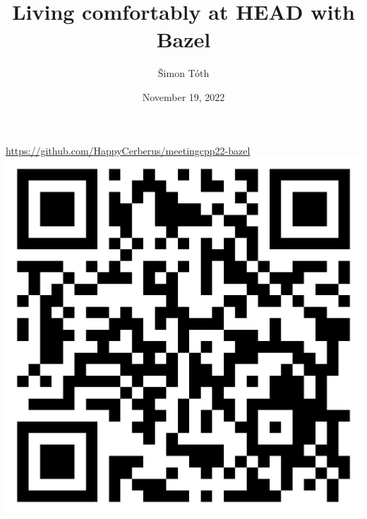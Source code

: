 \documentclass[aspectratio=169]{beamer}
\date{November 19, 2022}
\title{Living comfortably at HEAD with Bazel}
\author{Šimon Tóth}
\begin{document}
\begin{frame}{}
    \titlepage
\end{frame}

\begin{frame}{}
\begin{center}
        \Large\href{https://github.com/HappyCerberus/meetingcpp22-bazel}{https://github.com/HappyCerberus/meetingcpp22-bazel}\\
        \includegraphics[width=.4\textwidth]{static/qrcode.png}
\end{center}
\end{frame}
\end{document}
